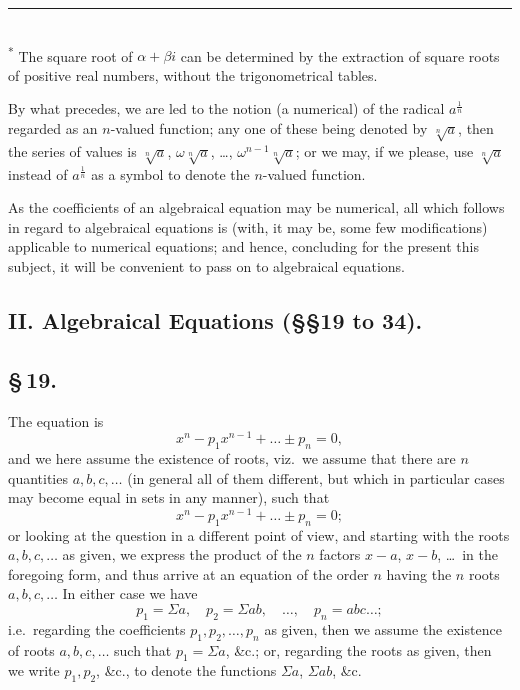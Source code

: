 \documentclass[11pt,a4paper]{article}
\begin{document}
\smallskip
\small\noindent\rule{0.4\textwidth}{0.4pt}\\
\textsuperscript{*} The square root of $\alpha + \beta i$ can be determined by the extraction of square roots of positive real numbers, without the trigonometrical tables.
\normalsize

By what precedes, we are led to the notion (a numerical) of the radical $a^{\frac{1}{n}}$ regarded as an $n$-valued function; any one of these being denoted by $\sqrt[n]{a}$, then the series of values is $\sqrt[n]{a}$, $\omega\sqrt[n]{a}$, \ldots, $\omega^{n-1}\sqrt[n]{a}$; or we may, if we please, use $\sqrt[n]{a}$ instead of $a^{\frac{1}{n}}$ as a symbol to denote the $n$-valued function.

As the coefficients of an algebraical equation may be numerical, all which follows in regard to algebraical equations is (with, it may be, some few modifications) applicable to numerical equations; and hence, concluding for the present this subject, it will be convenient to pass on to algebraical equations.

\subsection*{II. Algebraical Equations (\S\S 19 to 34).}

\subsection*{\S\,19.}

The equation is
\[
x^{n} - p_{1}x^{n-1} + \ldots \pm p_{n} = 0,
\]
and we here assume the existence of roots, viz.\ we assume that there are $n$ quantities $a, b, c, \ldots$ (in general all of them different, but which in particular cases may become equal in sets in any manner), such that
\[
x^{n} - p_{1}x^{n-1} + \ldots \pm p_{n} = 0;
\]
or looking at the question in a different point of view, and starting with the roots $a, b, c, \ldots$ as given, we express the product of the $n$ factors $x - a$, $x - b$, \ldots\ in the foregoing form, and thus arrive at an equation of the order $n$ having the $n$ roots $a, b, c, \ldots$ In either case we have
\[
p_{1} = \Sigma a, \quad p_{2} = \Sigma ab, \quad \ldots, \quad p_{n} = abc\ldots;
\]
i.e.\ regarding the coefficients $p_{1}, p_{2}, \ldots, p_{n}$ as given, then we assume the existence of roots $a, b, c, \ldots$ such that $p_{1} = \Sigma a$, \&c.; or, regarding the roots as given, then we write $p_{1}, p_{2}$, \&c., to denote the functions $\Sigma a$, $\Sigma ab$, \&c.
\end{document}
